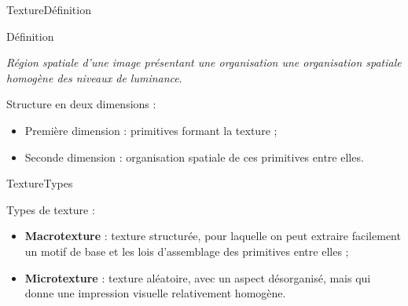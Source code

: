\begin{frame}{Texture}{Définition}
\begin{block}{Définition}

\textit{Région spatiale d'une image présentant une organisation une organisation spatiale homogène des niveaux de luminance}.

Structure en deux dimensions :

\begin{itemize}
    \item Première dimension :  primitives formant la texture ;
    \item Seconde dimension : organisation spatiale de ces primitives entre elles.
\end{itemize}

\end{block}

\end{frame}

\begin{frame}{Texture}{Types}
\begin{block}{Types de texture :}

\begin{itemize}
    \item \textbf{Macrotexture} : texture structurée, pour laquelle on peut extraire facilement un motif de base et les lois d'assemblage des primitives entre elles ;
    \item \textbf{Microtexture} : texture aléatoire, avec un aspect désorganisé, mais qui donne une impression visuelle relativement homogène.
\end{itemize}

\end{block}
\end{frame}

